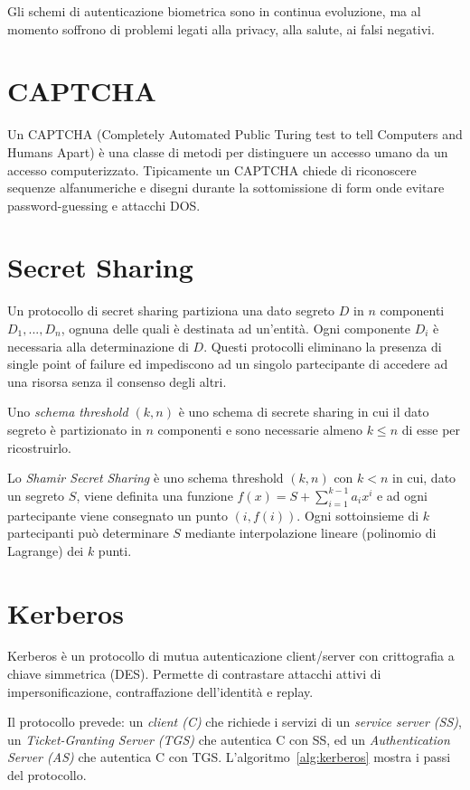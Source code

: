Gli schemi di autenticazione biometrica sono in continua evoluzione, ma al momento soffrono di problemi legati alla privacy, alla salute, ai falsi negativi.


\section{CAPTCHA}
Un CAPTCHA (Completely Automated Public Turing test to tell Computers and Humans Apart) è una classe di metodi per distinguere un accesso umano da un accesso computerizzato.
Tipicamente un CAPTCHA chiede di riconoscere sequenze alfanumeriche e disegni durante la sottomissione di form onde evitare password-guessing e attacchi DOS.


\section{Secret Sharing}
Un protocollo di secret sharing partiziona una dato segreto $D$ in $n$ componenti $D_{1},...,D_{n}$, ognuna delle quali è destinata ad un'entità.
Ogni componente $D_{i}$ è necessaria alla determinazione di $D$.
Questi protocolli eliminano la presenza di single point of failure ed impediscono ad un singolo partecipante di accedere ad una risorsa senza il consenso degli altri.

Uno \textit{schema threshold $(k,n)$} è uno schema di secrete sharing in cui il dato segreto è partizionato in $n$ componenti e sono necessarie almeno $k\leq n$ di esse per ricostruirlo.

Lo \textit{Shamir Secret Sharing} è uno schema threshold $(k,n)$ con $k<n$ in cui, dato un segreto $S$, viene definita una funzione $f(x)=S+\sum_{i=1}^{k-1}a_{i}x^{i}$ e ad ogni partecipante viene consegnato un punto $(i,f(i))$.
Ogni sottoinsieme di $k$ partecipanti può determinare $S$ mediante interpolazione lineare (polinomio di Lagrange) dei $k$ punti.


\section{Kerberos}
Kerberos è un protocollo di mutua autenticazione client/server con crittografia a chiave simmetrica (DES).
Permette di contrastare attacchi attivi di impersonificazione, contraffazione dell'identità e replay.

Il protocollo prevede: un \textit{client (C)} che richiede i servizi di un \textit{service server (SS)}, un \textit{Ticket-Granting Server (TGS)} che autentica C con SS, ed un \textit{Authentication Server (AS)} che autentica C con TGS.
L'algoritmo~\ref{alg:kerberos} mostra i passi del protocollo.

